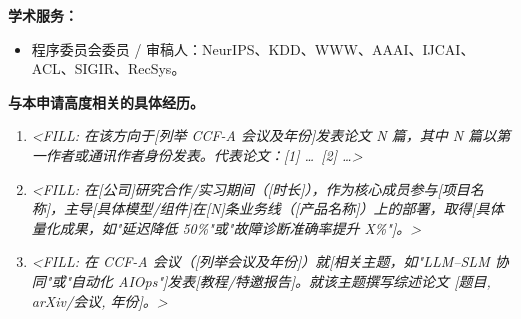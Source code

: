 \documentclass[lang=cn,a4paper,newtx,bibend=bibtex]{elegantpaper}
\begin{document}
\textbf{学术服务：}
\begin{itemize}[leftmargin=*, itemsep=1pt]
  \item 程序委员会委员 / 审稿人：NeurIPS、KDD、WWW、AAAI、IJCAI、ACL、SIGIR、RecSys。
\end{itemize}

\medskip
\noindent\textbf{与本申请高度相关的具体经历。}

\begin{enumerate}[leftmargin=*, itemsep=3pt]
  \item \textit{<FILL: 在该方向于[列举 CCF-A 会议及年份]发表论文 N 篇，其中 N 篇以第一作者或通讯作者身份发表。代表论文：[1] \ldots\ [2] \ldots>}
  \item \textit{<FILL: 在[公司]研究合作/实习期间（[时长]），作为核心成员参与[项目名称]，主导[具体模型/组件]在[N]条业务线（[产品名称]）上的部署，取得[具体量化成果，如"延迟降低 50\%"或"故障诊断准确率提升 X\%"]。>}
  \item \textit{<FILL: 在 CCF-A 会议（[列举会议及年份]）就[相关主题，如"LLM–SLM 协同"或"自动化 AIOps"]发表[教程/特邀报告]。就该主题撰写综述论文 [题目, arXiv/会议, 年份]。>}
\end{enumerate}

\printbibliography[title={参考文献}]
\end{document}
